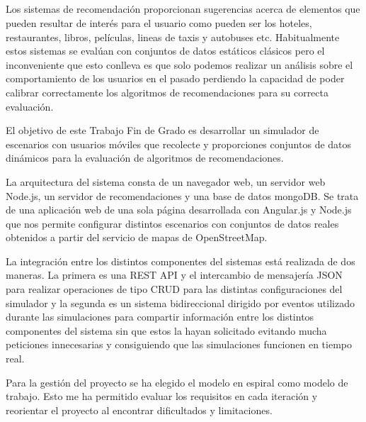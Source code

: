 \chapter*{}

\cleardoublepage
\thispagestyle{empty}

\begin{center}
{\large\bfseries \myTitle}\\
\end{center}

\vspace{0.7cm}
\\

Los sistemas de recomendación proporcionan sugerencias acerca de elementos que pueden resultar de interés para el usuario como pueden ser los hoteles, restaurantes, libros, películas, lineas de taxis y autobuses etc. Habitualmente estos sistemas se evalúan con conjuntos de datos estáticos clásicos pero el inconveniente que esto conlleva es que solo podemos realizar un análisis sobre el comportamiento de los usuarios en el pasado perdiendo la capacidad de poder calibrar correctamente los algoritmos de recomendaciones para su correcta evaluación.

El objetivo de este Trabajo Fin de Grado es desarrollar un simulador de escenarios con usuarios móviles que recolecte y proporciones conjuntos de datos dinámicos para la evaluación de algoritmos de recomendaciones. 

La arquitectura del sistema consta de un navegador web, un servidor web Node.js, un servidor de recomendaciones y una base de datos mongoDB. Se trata de una aplicación web de una sola página desarrollada con Angular.js y Node.js que nos permite configurar distintos escenarios con conjuntos de datos reales obtenidos a partir del servicio de mapas de OpenStreetMap.

La integración entre los distintos componentes del sistemas está realizada de dos maneras. La primera es una REST API y el intercambio de mensajería JSON para realizar operaciones de tipo CRUD para las distintas configuraciones del simulador y la segunda es un sistema bidireccional dirigido por eventos utilizado durante las simulaciones para compartir información entre los distintos componentes del sistema sin que estos la hayan solicitado evitando mucha peticiones innecesarias y consiguiendo que las simulaciones funcionen en tiempo real.

Para la gestión del proyecto se ha elegido el modelo en espiral como modelo de trabajo. Esto me ha permitido evaluar los requisitos en cada iteración y reorientar el proyecto al encontrar dificultados y limitaciones.

